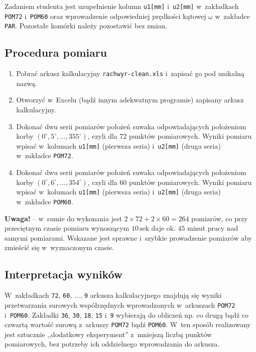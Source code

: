 \documentclass[paper=a4,DIV=12]{tmmlab}
\newcommand{\degree}{^{\circ}}
\begin{document}
Zadaniem studenta jest uzupełnienie kolumn \texttt{u1[mm]} i~\texttt{u2[mm]}
w~zakładkach \texttt{POM72} i~\texttt{POM60} oraz wprowadzenie
odpowiedniej prędkości kątowej $\omega$ w~zakładce \texttt{PAR}. Pozostałe
komórki należy pozostawić bez zmian.

\subsection{Procedura pomiaru}
\label{sec:GCODS}

\begin{enumerate}
  \item Pobrać arkusz kalkulacyjny \texttt{rachwyr-clean.xls} i~zapisać go pod
    unikalną nazwą.
  \item Otworzyć w~Excelu (bądź innym adekwatnym programie) zapisany arkusz
    kalkulacyjny.
  \item Dokonać dwu serii pomiarów położeń suwaka odpowiadających położeniom
    korby $(0\degree, 5\degree, \dots, 355\degree)$, czyli dla $72$  punktów
    pomiarowych. Wyniki pomiaru wpisać w~kolumach \texttt{u1[mm]} (pierwsza
    seria) i~\texttt{u2[mm]} (druga seria) w~zakładce \texttt{POM72}.
  \item Dokonać dwu serii pomiarów położeń suwaka odpowiadających położeniom
    korby $(0\degree, 6\degree, \dots, 354\degree)$, czyli dla $60$  punktów
    pomiarowych. Wyniki pomiaru wpisać w~kolumach \texttt{u1[mm]} (pierwsza
    seria) i~\texttt{u2[mm]} (druga seria) w~zakładce \texttt{POM60}.
\end{enumerate}

\textbf{Uwaga!} -- w~sumie do wykonania jest $2 \times 72 + 2 \times 60 = 264$
pomiarów, co przy przeciętnym czasie pomiaru wynoszącym $10\,\text{sek}$ daje
ok. $45$ minut pracy nad samymi pomiarami. Wskazane jest sprawne i~szybkie
prowadzenie pomiarów aby zmieścić się w~wyznaczonym czasie.

\subsection{Interpretacja wyników}
\label{sec:M05YK}

W~zakładkach \texttt{72}, \texttt{60}, $\dots$, \texttt{9} arkusza
kalkulacyjnego znajdują się wyniki przetwarzania surowych współrzędnych
wprowadzonych w~arkuszach \texttt{POM72} i~\texttt{POM60}. Zakładki
\texttt{36}, \texttt{30}, \texttt{18}, \texttt{15} i~\texttt{9}  wybierają do
obliczeń np. co drugą bądź co czwartą wartość surową z~arkuszy \texttt{POM72}
bądź \texttt{POM60}. W~ten sposób realizowany jest sztucznie ,,dodatkowy
eksperyment'' z~mniejszą liczbą punktów pomiarowych, bez potrzeby ich
oddzielnego wprowadzania do arkusza.
\end{document}
